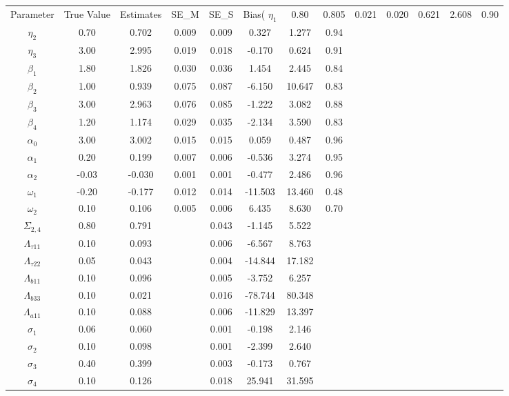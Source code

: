 \begin{table}[ht]
\centering
\begin{tabular}{cccccccc}
  \hline
Parameter & True Value & Estimates & SE_M & SE_S & Bias(%
  \hline
$\eta_1$ & 0.80 & 0.805 & 0.021 & 0.020 & 0.621 & 2.608 & 0.90 \\ 
  $\eta_2$ & 0.70 & 0.702 & 0.009 & 0.009 & 0.327 & 1.277 & 0.94 \\ 
  $\eta_3$ & 3.00 & 2.995 & 0.019 & 0.018 & -0.170 & 0.624 & 0.91 \\ 
  $\beta_1$ & 1.80 & 1.826 & 0.030 & 0.036 & 1.454 & 2.445 & 0.84 \\ 
  $\beta_2$ & 1.00 & 0.939 & 0.075 & 0.087 & -6.150 & 10.647 & 0.83 \\ 
  $\beta_3$ & 3.00 & 2.963 & 0.076 & 0.085 & -1.222 & 3.082 & 0.88 \\ 
  $\beta_4$ & 1.20 & 1.174 & 0.029 & 0.035 & -2.134 & 3.590 & 0.83 \\ 
  $\alpha_0$ & 3.00 & 3.002 & 0.015 & 0.015 & 0.059 & 0.487 & 0.96 \\ 
  $\alpha_1$ & 0.20 & 0.199 & 0.007 & 0.006 & -0.536 & 3.274 & 0.95 \\ 
  $\alpha_2$ & -0.03 & -0.030 & 0.001 & 0.001 & -0.477 & 2.486 & 0.96 \\ 
  $\omega_1$ & -0.20 & -0.177 & 0.012 & 0.014 & -11.503 & 13.460 & 0.48 \\ 
  $\omega_2$ & 0.10 & 0.106 & 0.005 & 0.006 & 6.435 & 8.630 & 0.70 \\ 
   \hline
$\Sigma_{2,4}$ & 0.80 & 0.791 &  & 0.043 & -1.145 & 5.522 &  \\ 
  $\Lambda_{\tau11}$ & 0.10 & 0.093 &  & 0.006 & -6.567 & 8.763 &  \\ 
  $\Lambda_{\tau22}$ & 0.05 & 0.043 &  & 0.004 & -14.844 & 17.182 &  \\ 
  $\Lambda_{b11}$ & 0.10 & 0.096 &  & 0.005 & -3.752 & 6.257 &  \\ 
  $\Lambda_{b33}$ & 0.10 & 0.021 &  & 0.016 & -78.744 & 80.348 &  \\ 
  $\Lambda_{a11}$ & 0.10 & 0.088 &  & 0.006 & -11.829 & 13.397 &  \\ 
  $\sigma_1$ & 0.06 & 0.060 &  & 0.001 & -0.198 & 2.146 &  \\ 
  $\sigma_2$ & 0.10 & 0.098 &  & 0.001 & -2.399 & 2.640 &  \\ 
  $\sigma_3$ & 0.40 & 0.399 &  & 0.003 & -0.173 & 0.767 &  \\ 
  $\sigma_4$ & 0.10 & 0.126 &  & 0.018 & 25.941 & 31.595 &  \\ 
   \hline
\end{tabular}
\end{table}
